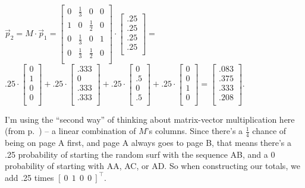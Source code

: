 \begin{alttitles}
\vspace{-.15in}
\begin{center}
$\overrightarrow{p}_2 = M \cdot \overrightarrow{p}_1 = 
\begin{bmatrix}
0 & \frac{1}{3} & 0 & 0 \\
1 & 0 & \frac{1}{2} & 0 \\
0 & \frac{1}{3} & 0 & 1 \\
0 & \frac{1}{3} & \frac{1}{2} & 0 \\
\end{bmatrix} \cdot
\begin{bmatrix}
.25 \\
.25 \\
.25 \\
.25 \\
\end{bmatrix} =$ \\
\medskip
$.25 \cdot
\begin{bmatrix}
0 \\
1 \\
0 \\
0 \\
\end{bmatrix} +
.25 \cdot
\begin{bmatrix}
.333 \\
0 \\
.333 \\
.333 \\
\end{bmatrix} +
.25 \cdot
\begin{bmatrix}
0 \\
.5 \\
0 \\
.5 \\
\end{bmatrix} +
.25 \cdot
\begin{bmatrix}
0 \\
0 \\
1 \\
0 \\
\end{bmatrix} = 
\begin{bmatrix}
.083 \\
.375 \\
.333 \\
.208 \\
\end{bmatrix}.
$
\end{center}
\vspace{-.15in}

I'm using the ``second way'' of thinking about matrix-vector multiplication
here (from p.~\pageref{twoInterpretations}) -- a linear combination of $M$'s
columns. Since there's a $\frac{1}{4}$ chance of being on page A first, and
page A always goes to page B, that means there's a .25 probability of starting
the random surf with the sequence AB, and a 0 probability of starting with AA,
AC, or AD. So when constructing our totals, we add .25 times $[\ 0\ \ 1\ \ 0\ \
0\ ]^\intercal$.


\end{alttitles}
